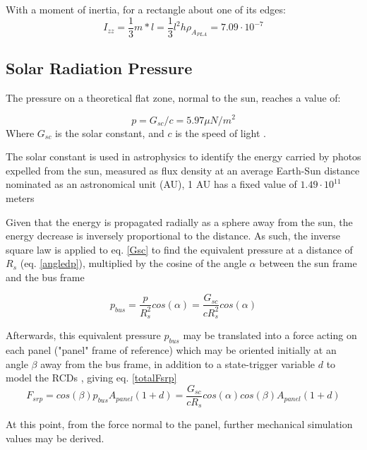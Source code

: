 With a moment of inertia, for a rectangle about one of its edges:
\begin{equation}
    I_{zz}= \frac{1}{3} m*l = \frac{1}{3} l^2h\rho_{A_{PLA}} = 7.09\cdot10^{-7} 
\label{inertia}
\end{equation}

\subsection{Solar Radiation Pressure} \label{srp}

The pressure on a theoretical flat zone, normal to the sun, reaches a value of:

\begin{equation}
p = G_{sc}/c = 5.97 \mu N/m^2
\label{Gsc}
\end{equation}
Where $G_{sc}$ is the solar constant, and $c$ is the speed of light \protect\cite{solarhandbook}. 

The solar constant is used in astrophysics to identify the
energy carried by photos expelled from the sun, measured as
flux density at an average Earth-Sun distance nominated as an
astronomical unit (AU), 1 AU has a fixed value of $1.49\cdot10^{11}$ meters \protect\cite{Astro}

Given that the energy is propagated radially as a sphere away from the sun, the energy decrease is inversely proportional to the distance. As such, the inverse square law is applied to eq. \ref{Gsc} to find the equivalent pressure at a distance of $R_s$ (eq. \ref{angledp}), multiplied by the cosine of the angle $\alpha$ between the sun frame and the bus frame \protect\cite{sundyn}

\begin{equation}
p_{bus} = \frac{p}{R_s^2} cos(\alpha) = \frac{G_{sc}}{c R_s^2} cos(\alpha)
\label{angledp}
\end{equation}

Afterwards, this equivalent pressure $p_{bus}$ may be translated into a force acting on each panel ("panel" frame of reference) which may be oriented initially at an angle $\beta$ away from the bus frame, in addition to a state-trigger variable $d$ to model the RCDs \protect\cite{attitudeAndres}, giving eq. \ref{totalFsrp}
\begin{equation}
F_{srp} = cos(\beta)p_{bus}A_{panel}(1+d) = \frac{G_{sc}}{c R_s} cos(\alpha)cos(\beta)A_{panel}(1+d)
\label{totalFsrp}
\end{equation}

At this point, from the force normal to the panel, further mechanical simulation values may be derived.

